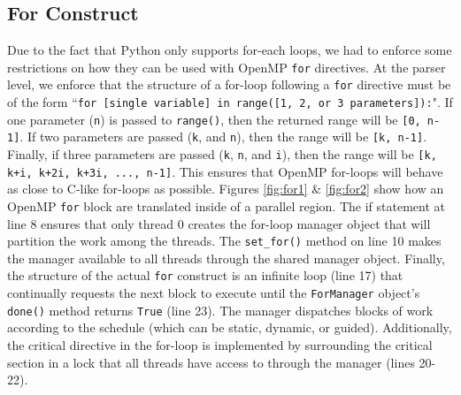 \documentclass[letterpaper,12pt]{article} %
\begin{document}
\subsection{For Construct}
Due to the fact that Python only supports for-each loops, we had to enforce some restrictions on how they can be used with OpenMP \texttt{for} directives. At the parser level, we enforce that the structure of a for-loop following a \texttt{for} directive must be of the form  ``\texttt{for [single variable] in range([1, 2, or 3 parameters]):}". If one parameter (\texttt{n}) is passed to \texttt{range()}, then the returned range will be \texttt{[0, n-1]}. If two parameters are passed (\texttt{k}, and \texttt{n}), then the range will be \texttt{[k, n-1]}. Finally, if three parameters are passed (\texttt{k}, \texttt{n}, and \texttt{i}), then the range will be \texttt{[k, k+i, k+2i, k+3i, ..., n-1]}. This ensures that OpenMP for-loops will behave as close to C-like for-loops as possible. Figures \ref{fig:for1} \& \ref{fig:for2} show how an OpenMP \texttt{for} block are translated inside of a parallel region. The if statement at line 8 ensures that only thread 0 creates the for-loop manager object that will partition the work among the threads. The \texttt{set\_for()} method on line 10 makes the manager available to all threads through the shared manager object. Finally, the structure of the actual \texttt{for} construct is an infinite loop (line 17) that continually requests the next block to execute until the \texttt{ForManager} object's \texttt{done()} method returns \texttt{True} (line 23). The manager dispatches blocks of work according to the schedule (which can be static, dynamic, or guided). Additionally, the critical directive in the for-loop is implemented by surrounding the critical section in a lock that all threads have access to through the manager (lines 20-22). 
\end{document}
